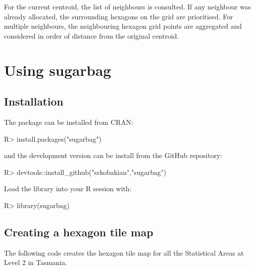 \documentclass[
]{jss}
\begin{document}
For the current centroid, the list of neighbours is consulted. If any
neighbour was already allocated, the surrounding hexagons on the grid
are prioritised. For multiple neighbours, the neighbouring hexagon grid
points are aggregated and considered in order of distance from the
original centroid.

\hypertarget{using-sugarbag}{%
\section{Using sugarbag}\label{using-sugarbag}}

\hypertarget{installation}{%
\subsection{Installation}\label{installation}}

The package can be installed from CRAN:

\begin{CodeChunk}

\begin{CodeInput}
R> install.packages("sugarbag")
\end{CodeInput}
\end{CodeChunk}

and the development version can be install from the GitHub repository:

\begin{CodeChunk}

\begin{CodeInput}
R> devtools::install_github("srkobakian","sugarbag")
\end{CodeInput}
\end{CodeChunk}

Load the library into your R session with:

\begin{CodeChunk}

\begin{CodeInput}
R> library(sugarbag)
\end{CodeInput}
\end{CodeChunk}

\hypertarget{creating-a-hexagon-tile-map}{%
\subsection{Creating a hexagon tile
map}\label{creating-a-hexagon-tile-map}}

The following code creates the hexagon tile map for all the Statistical
Areas at Level 2 in Tasmania.
\end{document}
